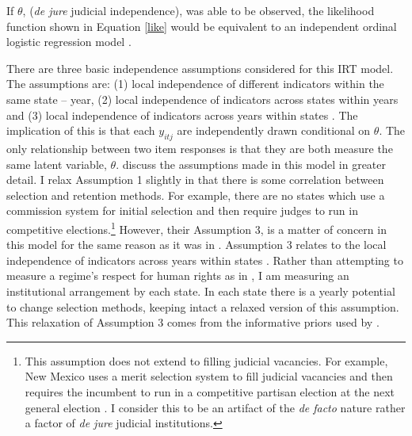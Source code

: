 \documentclass[12pt]{article}
\begin{document}
If $\theta$, (\textit{de jure} judicial independence), was able to be observed, the likelihood function shown in Equation \ref{like} would be equivalent to an independent ordinal logistic regression model \citep[8]{Schnakenberg2014}.  

There are three basic independence assumptions considered for this IRT model.  The assumptions are: (1) local independence of different indicators within the same state -- year, (2) local independence of indicators across states within years and (3) local independence of indicators across years within states \citep[8]{Schnakenberg2014}.  The implication of this is that each $y_{itj}$ are independently drawn conditional on $\theta$.  The only relationship between two item responses is that they are both measure the same latent variable, $\theta$. \citet[8]{Schnakenberg2014} discuss the assumptions made in this model in greater detail.  I relax Assumption 1 slightly in that there is some correlation between selection and retention methods. For example, there are no states which use a commission system for initial selection and then require judges to run in competitive elections.\footnote{This assumption does not extend to filling judicial vacancies.  For example, New Mexico uses a merit selection system to fill judicial vacancies and then requires the incumbent to run in a competitive partisan election at the next general election \citep{AJS}.  I consider this to be an artifact of the \textit{de facto} nature rather a factor of \textit{de jure} judicial institutions.}  However, their Assumption 3, is a matter of concern in this model for the same reason as it was in \citet{Schnakenberg2014}.  Assumption 3 relates to the local independence of indicators across years within states \citep[8]{Schnakenberg2014}.  Rather than attempting to measure a regime's respect for human rights as in \citet{Schnakenberg2014}, I am measuring an institutional arrangement by each state.  In each state there is a yearly potential to change selection methods, keeping intact a relaxed version of this assumption.  This relaxation of Assumption 3 comes from the informative priors used by \citet[8]{Schnakenberg2014}.    
\end{document}
